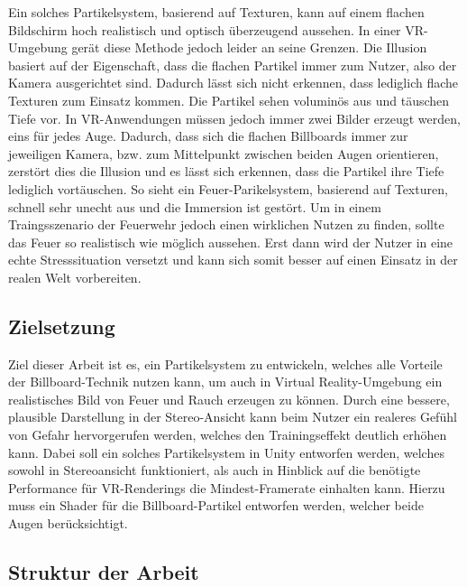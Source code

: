 Ein solches Partikelsystem, basierend auf Texturen, kann auf einem flachen Bildschirm hoch realistisch
und optisch überzeugend aussehen. In einer VR-Umgebung gerät diese Methode jedoch leider an seine Grenzen. 
Die Illusion basiert auf der Eigenschaft, dass die flachen Partikel immer zum Nutzer, also der Kamera
ausgerichtet sind. Dadurch lässt sich nicht erkennen, dass lediglich flache Texturen zum Einsatz kommen.
Die Partikel sehen voluminös aus und täuschen Tiefe vor. 
In VR-Anwendungen müssen jedoch immer zwei Bilder erzeugt werden, eins für jedes Auge. 
Dadurch, dass sich die flachen Billboards immer zur jeweiligen Kamera, bzw. zum Mittelpunkt 
zwischen beiden Augen orientieren, zerstört dies die Illusion und es lässt sich erkennen, dass
die Partikel ihre Tiefe lediglich vortäuschen. So sieht ein Feuer-Parikelsystem, basierend auf Texturen,
schnell sehr unecht aus und die Immersion ist gestört. 
Um in einem Traingsszenario der Feuerwehr jedoch einen wirklichen Nutzen zu finden, sollte das Feuer 
so realistisch wie möglich aussehen. Erst dann wird der Nutzer in eine echte Stresssituation versetzt
und kann sich somit besser auf einen Einsatz in der realen Welt vorbereiten. 

\subsection{Zielsetzung}

Ziel dieser Arbeit ist es, ein Partikelsystem zu entwickeln, welches alle Vorteile der Billboard-Technik 
nutzen kann, um auch in Virtual Reality-Umgebung ein realistisches Bild von Feuer und Rauch erzeugen 
zu können. Durch eine bessere, plausible Darstellung in der Stereo-Ansicht kann beim Nutzer ein realeres 
Gefühl von Gefahr hervorgerufen werden, welches den Trainingseffekt deutlich erhöhen kann. Dabei soll 
ein solches Partikelsystem in Unity entworfen werden, welches sowohl in Stereoansicht funktioniert, 
als auch in Hinblick auf die benötigte Performance für VR-Renderings die Mindest-Framerate einhalten kann.
Hierzu muss ein Shader für die Billboard-Partikel entworfen werden, welcher beide Augen berücksichtigt.



\subsection{Struktur der Arbeit}


\newpage
